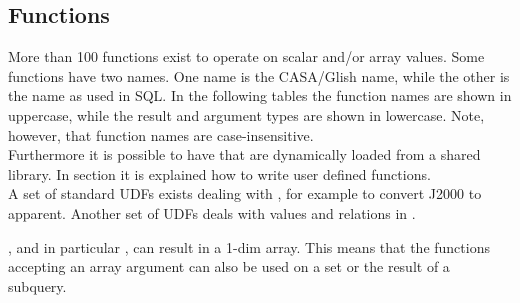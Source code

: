 \subsection{\label{TAQL:FUNCTIONS}Functions}
More than 100 functions exist to operate on scalar and/or array values.
Some functions have two names. One name is the CASA/Glish name, while the
other is the name as used in SQL.
In the following tables the function names are shown in uppercase,
while the result and argument types are shown in lowercase.
Note, however, that function names are case-insensitive.
\\Furthermore it is possible to have 
that are dynamically loaded from a shared library. In section
 it is
explained how to write user defined functions.
\\A set of standard UDFs exists dealing with
, for example to
convert J2000 to apparent.
Another set of UDFs deals with values and relations in
. 

, and in particular
, can result in a 1-dim array.
This means that the functions accepting an array argument can also
be used on a set or the result of a subquery.

